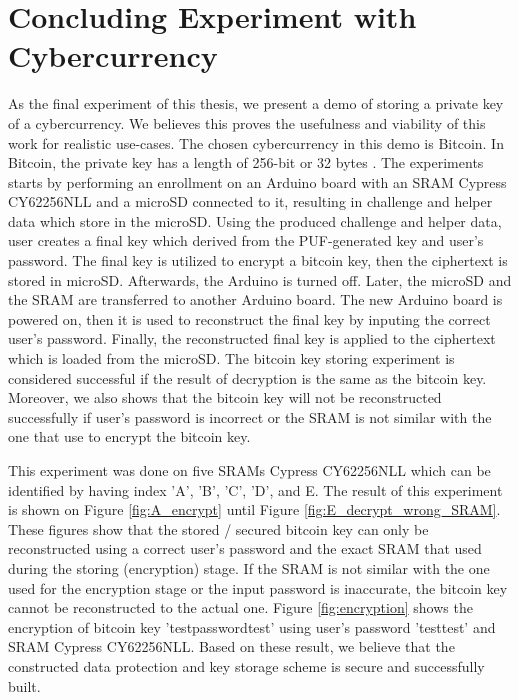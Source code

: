\section{Concluding Experiment with Cybercurrency}
As the final experiment of this thesis, we present a demo of storing a private key of a cybercurrency. We believes this proves the usefulness and viability of this work for realistic use-cases. The chosen cybercurrency in this demo is Bitcoin. In Bitcoin, the private key has a length of 256-bit or 32 bytes \cite{bitcoin_key}. The experiments starts by performing an enrollment on an Arduino board with an SRAM Cypress CY62256NLL and a microSD connected to it, resulting in challenge and helper data which store in the microSD. Using the produced challenge and helper data, user creates a final key which derived from the PUF-generated key and user's password. The final key is utilized to encrypt a bitcoin key, then the ciphertext is stored in microSD. Afterwards, the Arduino is turned off.
Later, the microSD and the SRAM are transferred to another Arduino board. The new Arduino board is powered on, then it is used to reconstruct the final key by inputing the correct user's password. Finally, the reconstructed final key is applied to the ciphertext which is loaded from the microSD. The bitcoin key storing experiment is considered successful if the result of decryption is the same as the bitcoin key.
Moreover, we also shows that the bitcoin key will not be reconstructed successfully if user's password is incorrect or the SRAM is not similar with the one that use to encrypt the bitcoin key.

This experiment was done on five SRAMs Cypress CY62256NLL which can be identified by having index 'A', 'B', 'C', 'D', and E.
The result of this experiment is shown on Figure \ref{fig:A_encrypt} until Figure \ref{fig:E_decrypt_wrong_SRAM}. These figures show that the stored / secured bitcoin key can only be reconstructed using a correct user's password and the exact SRAM that used during the storing (encryption) stage. If the SRAM is not similar with the one used for the encryption stage or the input password is inaccurate, the bitcoin key cannot be reconstructed to the actual one.
Figure \ref{fig:encryption} shows the encryption of bitcoin key 'testpasswordtest' using user's password 'testtest' and SRAM Cypress CY62256NLL.
Based on these result, we believe that the constructed data protection and key storage scheme is secure and successfully built.

